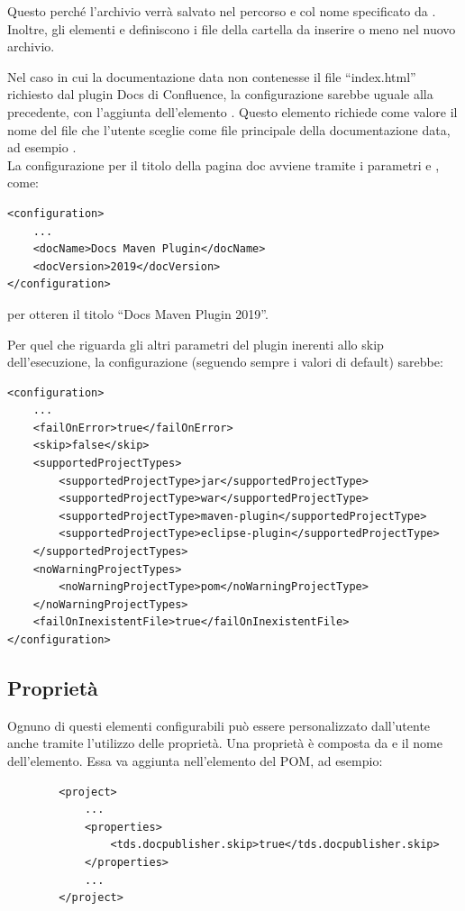 Questo perché l'archivio verrà salvato nel percorso e col nome specificato da .
Inoltre, gli elementi  e  definiscono i file della cartella da inserire o meno nel nuovo archivio.

Nel caso in cui la documentazione data non contenesse il file ``index.html'' richiesto dal plugin Docs di Confluence, la configurazione sarebbe uguale alla precedente, con l'aggiunta dell'elemento .
Questo elemento richiede come valore il nome del file che l'utente sceglie come file principale della documentazione data, ad esempio .\\


La configurazione per il titolo della pagina doc avviene tramite i parametri  e , come:
\begin{lstlisting}
<configuration>
    ...
    <docName>Docs Maven Plugin</docName>
    <docVersion>2019</docVersion>
</configuration>
\end{lstlisting}
per otteren il titolo ``Docs Maven Plugin 2019''.

Per quel che riguarda gli altri parametri del plugin inerenti allo skip dell'esecuzione, la configurazione (seguendo sempre i valori di default) sarebbe:

\begin{lstlisting}
<configuration>
    ...
    <failOnError>true</failOnError>
    <skip>false</skip>
    <supportedProjectTypes>
        <supportedProjectType>jar</supportedProjectType>
        <supportedProjectType>war</supportedProjectType>
        <supportedProjectType>maven-plugin</supportedProjectType>
        <supportedProjectType>eclipse-plugin</supportedProjectType>
    </supportedProjectTypes>
    <noWarningProjectTypes> 
        <noWarningProjectType>pom</noWarningProjectType>
    </noWarningProjectTypes>
    <failOnInexistentFile>true</failOnInexistentFile>
</configuration>
\end{lstlisting}

    \subsection{Proprietà}
    Ognuno di questi elementi configurabili può essere personalizzato dall'utente anche tramite l'utilizzo delle proprietà.
    Una proprietà è composta da  e il nome dell'elemento. Essa va aggiunta nell'elemento  del POM, ad esempio:
        \begin{lstlisting}
        <project>
            ...
            <properties>
                <tds.docpublisher.skip>true</tds.docpublisher.skip>
            </properties>
            ...    
        </project>
        \end{lstlisting}

